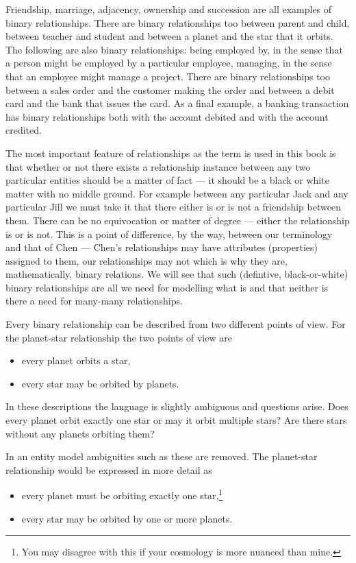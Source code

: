 \mynote
Friendship,  marriage, adjacency, ownership and succession are all examples of binary relationships. There are binary relationships too  between parent and child, between teacher and student and between a planet and the star that it orbits.   
The following are also binary relationships:
being employed by, in the sense that a person might be employed by a particular employee,
managing, in the sense that an employee might manage a project. 
There are binary relationships too between a sales order and the customer making the order and between a debit card and  the bank that issues the card. As a final example, a banking transaction has binary relationships both with the account debited and with the account credited. 

\mynote The most important feature of relationships as the term is used  in this book is that
whether or not there exists a relationship instance between any two particular entities 
should be a matter of fact --- it should be a  black or white matter with no middle ground. 
For example between any particular Jack and any particular Jill we must take it that there either is or is not a friendship between them. There can be no equivocation or matter of degree --- either the relationship is or is not. This is a point of difference, by the way, between our terminology and that of Chen --- Chen's relationships may have attributes (properties) assigned to them, our relationships may not which is why they are, mathematically, binary relations. We will see that such (defintive, black-or-white) binary relationships are all we need for modelling what is and that neither is there a need for many-many relationships. 

\mynote 
Every binary relationship can be described from two different points of view. 
For the planet-star relationship the two points of view are
\begin{itemize}
\item every planet orbits a star,
\item every star may be orbited by planets.
\end{itemize}

In these descriptions the language is slightly ambiguous and questions arise.
Does every planet orbit exactly one star or may it orbit multiple stars? 
Are there stars without any planets orbiting them?

In an entity model ambiguities such as these are removed. 
The planet-star relationship would be expressed in more detail as
\begin{itemize}
\item every planet must be orbiting exactly one star,\footnote{You may disagree with this if your cosmology is more nuanced than mine.}
\item every star may be orbited by one or more planets.
\end{itemize}

